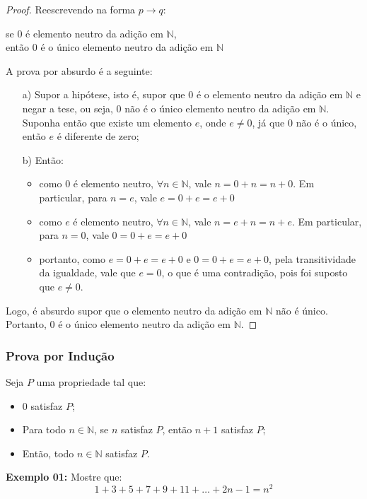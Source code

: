 \documentclass[oneside,a4paper,12pt]{article}
\newtheorem{proof}{Demonstração}
\begin{document}
\begin{proof}
	Reescrevendo na forma $p \rightarrow q$:
	\begin{center}
		se $0$ é elemento neutro da adição em $\mathbb{N}$, \\ então $0$ é o único elemento neutro da adição em $\mathbb{N}$
	\end{center}
A prova por absurdo é a seguinte:
\begin{itemize}
	\item [a)] Supor a hipótese, isto é, supor que $0$ é o elemento neutro da adição em $\mathbb{N}$ e negar a tese, ou seja, $0$ não é o único elemento neutro da adição em $\mathbb{N}$. \\ Suponha então que existe um elemento $e$, onde $e \neq 0$, já que $0$ não é o único, então $e$ é diferente de zero;
	\item [b)] Então:
	\begin{itemize}
		\item como $0$ é elemento neutro, $\forall n \in \mathbb{N}$, vale $n=0+n=n+0$. Em particular, para $n=e$, vale $e=0+e=e+0$
		\item como $e$ é elemento neutro, $\forall n \in \mathbb{N}$, vale $n=e+n=n+e$. Em particular, para $n=0$, vale $0=0+e=e+0$
		\item portanto, como $e=0+e=e+0$ e $0=0+e=e+0$, pela transitividade da igualdade, vale que $e=0$, o que é uma contradição, pois foi suposto que $e \neq 0$.
	\end{itemize}
\end{itemize}
Logo, é absurdo supor que o elemento neutro da adição em $\mathbb{N}$ não é único. Portanto, $0$ é o único elemento neutro da adição em $\mathbb{N}$.

\end{proof}

\subsubsection{Prova por Indução}

Seja $P$ uma propriedade tal que:
\begin{itemize}
	\item $0$ satisfaz $P$;
	\item Para todo $n \in \mathbb{N}$, se $n$ satisfaz $P$, então $n+1$ satisfaz $P$;
	\item Então, todo $n \in \mathbb{N}$ satisfaz $P$.
\end{itemize}

{\bf Exemplo 01:} Mostre que:
$$1+3+5+7+9+11+\dots+2n-1=n^{2}$$
\end{document}
